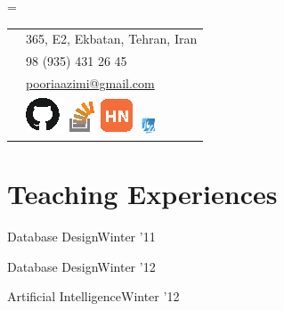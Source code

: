 \documentclass{tccv}
\newcommand{\plus}{\raisebox{.1\height}{\scalebox{.8}{+}}}
\begin{document}
{{\needspace{0.5\textheight}%
    \newdimen\boxwidth%
    \boxwidth=\dimexpr{}\fboxsep\relax%
    \colorbox[HTML]{BEDBE3}{%
    \begin{tabularx}{\boxwidth}{c|X}
	    \Writinghand & 
	    {365, E2, Ekbatan, Tehran, Iran}\smallskip\\
	    \Telefon     & 
	    {\plus{ }98 (935) 431 26 45}\smallskip\\
	    \Letter      & 
	    \href{mailto:pooriaazimi@gmail.com}{pooriaazimi@gmail.com}
	    \\[3pt]
	     & 
		\href{https://github.com/pooriaazimi/}{\includegraphics{Logos/GitHub.eps}}
		\href{http://stackoverflow.com/users/347353/pooria-azimi}{\includegraphics{Logos/StackOverflow.eps}}
		\href{https://news.ycombinator.com/user?id=pooriaazimi}{\includegraphics{Logos/HN.eps}}
		\href{http://forum.irmug.com}{\includegraphics[width=14pt]{Logos/IRMUG.pdf}}
	\end{tabularx}}
	





\vspace{8pt}











\section{Teaching Experiences}

\begin{ta}

\item{Database Design}{Winter '11}

\item{Database Design}{Winter '12}

\item{Artificial Intelligence}{Winter '12}


\end{ta}}}
\end{document}
